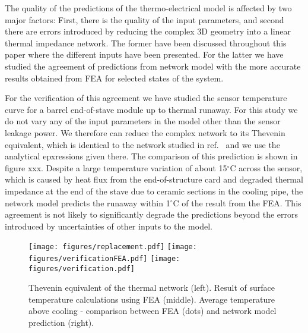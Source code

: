 The quality of the predictions of the thermo-electrical model is affected by two major factors: First, there is the quality of the input parameters, and second there are errors introduced by reducing the complex 3D geometry into a linear thermal impedance network. The former have been discussed throughout this paper where the different inputs have been presented. For the latter we have studied the agreement of predictions from network model with the more accurate results obtained from FEA for selected states of the system.

For the verification of this agreement we have studied the sensor temperature curve for a barrel end-of-stave module up to thermal runaway. For this study we do not vary any of the input parameters in the model other than the sensor leakage power. We therefore can reduce the complex network to its Thevenin equivalent, which is identical to the network studied in ref.~\cite{Beck:2010zzd} and we use the analytical epxressions given there. The comparison of this prediction is shown in figure xxx. Despite a large temperature variation of about 15$^\circ$C across the sensor, which is caused by heat flux from the end-of-structure card and degraded thermal impedance at the end of the stave due to ceramic sections in the cooling pipe, the network model predicts the runaway within 1$^\circ$C of the result from the FEA. This agreement is not likely to significantly degrade the predictions beyond the errors introduced by uncertainties of other inputs to the model. 

\begin{figure}[ht]
\centering
\texttt{[image: figures/replacement.pdf]}\quad\quad
\texttt{[image: figures/verificationFEA.pdf]}\quad\quad
\texttt{[image: figures/verification.pdf]}
\caption{Thevenin equivalent of the thermal network (left). Result of surface temperature calculations using FEA (middle). Average temperature above cooling - comparison between FEA (dots) and network model prediction (right).}
\label{fig:verification}
\end{figure}
